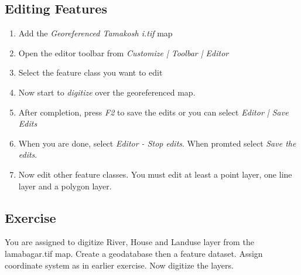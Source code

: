 \subsection{Editing Features}
\begin{enumerate}
	\item Add the \emph{Georeferenced Tamakosh	i.tif} map
	\item Open the editor toolbar from \emph{Customize | Toolbar | Editor}
	\item Select the feature class you want to edit
	\item Now start to \emph{digitize} over the georeferenced map.
	\item After completion, press \emph{F2} to save the edits or you can select \emph{Editor | Save Edits}
		\item When you are done, select \emph{Editor - Stop edits}. When promted select \emph{Save the edits}.
	\item Now edit other feature classes. You must edit at least a point layer, one line layer and a polygon layer.
\end{enumerate}

\subsection{Exercise}
You are assigned to digitize River, House and Landuse layer from the lamabagar.tif map. Create a geodatabase then a feature dataset. Assign coordinate system as in earlier exercise. Now digitize the layers.

